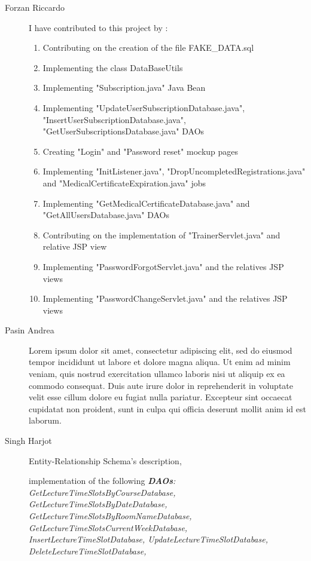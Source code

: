 \begin{description}
	\item[Forzan Riccardo] I have contributed to this project by :
	\begin{enumerate}
   		\item Contributing on the creation of the file FAKE_DATA.sql
   		\item Implementing the class DataBaseUtils
   		\item Implementing "Subscription.java" Java Bean
   		\item Implementing "UpdateUserSubscriptionDatabase.java", "InsertUserSubscriptionDatabase.java", "GetUserSubscriptionsDatabase.java" DAOs
   		\item Creating "Login" and "Password reset" mockup pages
   		\item Implementing "InitListener.java", "DropUncompletedRegistrations.java" and "MedicalCertificateExpiration.java" jobs
   		\item Implementing "GetMedicalCertificateDatabase.java" and "GetAllUsersDatabase.java" DAOs
   		\item Contributing on the implementation of "TrainerServlet.java" and relative JSP view
   		\item Implementing "PasswordForgotServlet.java" and the relatives JSP views
   		\item Implementing "PasswordChangeServlet.java" and the relatives JSP views
    \end{enumerate}

	\item[Pasin Andrea] Lorem ipsum dolor sit amet, consectetur adipiscing elit, sed do eiusmod tempor incididunt ut labore et dolore magna aliqua. Ut enim ad minim veniam, quis nostrud exercitation ullamco laboris nisi ut aliquip ex ea commodo consequat. Duis aute irure dolor in reprehenderit in voluptate velit esse cillum dolore eu fugiat nulla pariatur. Excepteur sint occaecat cupidatat non proident, sunt in culpa qui officia deserunt mollit anim id est laborum.
	\item[Singh Harjot] Entity-Relationship Schema's description,
	
	implementation of the following \textit{\textbf{DAOs}:
	    GetLectureTimeSlotsByCourseDatabase,
	    GetLectureTimeSlotsByDateDatabase,
	    GetLectureTimeSlotsByRoomNameDatabase,
	    GetLectureTimeSlotsCurrentWeekDatabase,
	    InsertLectureTimeSlotDatabase,
	    UpdateLectureTimeSlotDatabase,
	    DeleteLectureTimeSlotDatabase,
	}
    

\end{description}
